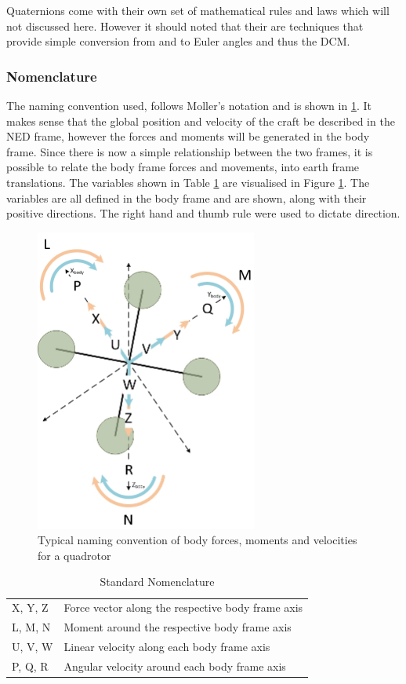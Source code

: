 		Quaternions come with their own set of mathematical rules and laws which will not discussed here. However it should noted that their are techniques that provide simple conversion from and to Euler angles and thus the DCM.  
		
		\subsubsection{Nomenclature}
		The naming convention used, follows Moller's notation \cite{Moller2015} and is shown in \ref{TAB_Nomenclature}. It makes sense that the global position and velocity of the craft be described in the NED frame, however the forces and moments will be generated in the body frame. Since there is now a simple relationship between the two frames, it is possible to relate the body frame forces and movements, into earth frame translations. The variables shown in Table \ref{TAB_Nomenclature} are visualised in Figure \ref{IM_Nomenclature}. The variables are all defined in the body frame and are shown, along with their positive directions. The right hand and thumb rule were used to dictate direction.
		
		\begin{figure}[H]
			\centering
			\includegraphics[height = 10cm]{Images/Literature/ForcesMoments.jpg}     
			\caption{Typical naming convention of body forces, moments and velocities for a quadrotor}
			\label{IM_Nomenclature}
		\end{figure}
		
		\begin{table}[!]
			\centering
			\begin{tabular}{| l | l |}
				X, Y, Z 	& Force vector along the respective body frame axis\\
				L, M, N 	& Moment around the respective body frame axis\\
				U, V, W 	& Linear velocity along each body frame axis\\
				P, Q, R  	& Angular velocity around each body frame axis\\
			\end{tabular}
			\label{TAB_Nomenclature}
			\caption{Standard Nomenclature}
		\end{table}
		
